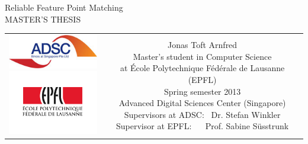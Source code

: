 \begin{titlepage}
\begin{center}
\sffamily


\null\vspace{2cm}
{\huge Reliable Feature Point Matching} \\[24pt]
{\small MASTER'S THESIS}
    
\vfill

\begin{tabular} {cc}
\parbox{0.3\textwidth}{\includegraphics[width=4cm]{images/adsc}\\[18pt]
\includegraphics[width=4cm]{images/epfl}}
&
\parbox{0.7\textwidth}{%
    Jonas Toft Arnfred\\
    Master's student in Computer Science\\
	at École Polytechnique Fédérale de Lausanne (EPFL)\\[9pt]
	Spring semester 2013\\
	Advanced Digital Sciences Center (Singapore)\\[9pt]
    Supervisors at ADSC: \ Dr. Stefan Winkler\\ [4pt]
    Supervisor at EPFL: ~ \ Prof. Sabine Süsstrunk\\ [4pt]
    \null \hspace{3em} }
	
%
\end{tabular}
\end{center}
\vspace{2cm}
\end{titlepage}
